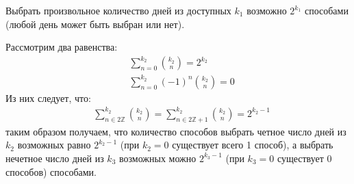\documentclass[a4paper,12pt]{article}
\begin{document}
\begin{Solution}
Выбрать произвольное количество дней из доступных $k_1$ возможно $2^{k_1}$ способами (любой день может быть выбран или нет).

Рассмотрим два равенства:
\[
	\begin{split}
		& \sum_{n=0}^{k_2} \binom{k_2}{n} = 2^{k_2} \\
		& \sum_{n=0}^{k_2} \left(-1\right)^n \binom{k_2}{n} = 0
	\end{split}
\]
Из них следует, что:
\[
	\begin{split}
		& \sum_{n \in 2 \mathbb{Z}}^{k_2} \binom{k_2}{n} = \sum_{n \in 2 \mathbb{Z} + 1}^{k_2} \binom{k_2}{n} = 2^{k_2 - 1}
	\end{split}
\]
таким образом получаем, что количество способов выбрать четное число дней из $k_2$ возможных равно $2^{k_2 - 1}$ (при $k_2 = 0$ существует всего 1 способ), а выбрать нечетное число дней из $k_3$ возможных можно $2^{k_3 - 1}$ (при $k_3 = 0$ существует 0 способов) способами.


\end{Solution}
\end{document}
